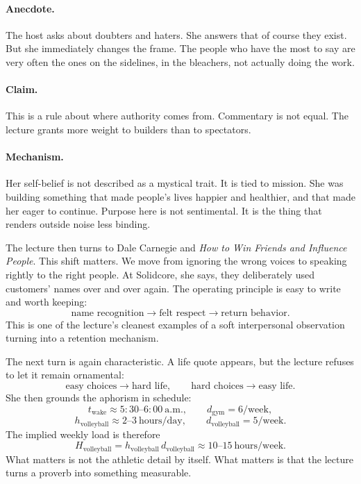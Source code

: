 \paragraph{Anecdote.}
The host asks about doubters and haters. She answers that of course they exist. But she immediately changes the frame. The people who have the most to say are very often the ones on the sidelines, in the bleachers, not actually doing the work.

\paragraph{Claim.}
This is a rule about where authority comes from. Commentary is not equal. The lecture grants more weight to builders than to spectators.

\paragraph{Mechanism.}
Her self-belief is not described as a mystical trait. It is tied to mission. She was building something that made people's lives happier and healthier, and that made her eager to continue. Purpose here is not sentimental. It is the thing that renders outside noise less binding.

The lecture then turns to Dale Carnegie and \emph{How to Win Friends and Influence People}. This shift matters. We move from ignoring the wrong voices to speaking rightly to the right people. At Solidcore, she says, they deliberately used customers' names over and over again. The operating principle is easy to write and worth keeping:
\begin{equation}
\text{name recognition}
\to
\text{felt respect}
\to
\text{return behavior}.
\end{equation}
This is one of the lecture's cleanest examples of a soft interpersonal observation turning into a retention mechanism.

The next turn is again characteristic. A life quote appears, but the lecture refuses to let it remain ornamental:
\begin{equation}
\text{easy choices} \to \text{hard life},
\qquad
\text{hard choices} \to \text{easy life}.
\end{equation}
She then grounds the aphorism in schedule:
\begin{equation}
t_{\text{wake}} \approx 5{:}30\text{--}6{:}00\ \text{a.m.},
\qquad
d_{\text{gym}} = 6/\text{week},
\end{equation}
\begin{equation}
h_{\text{volleyball}} \approx 2\text{--}3\ \text{hours/day},
\qquad
d_{\text{volleyball}} = 5/\text{week}.
\end{equation}
The implied weekly load is therefore
\begin{equation}
H_{\text{volleyball}}
=
h_{\text{volleyball}}\,d_{\text{volleyball}}
\approx
10\text{--}15\ \text{hours/week}.
\end{equation}
What matters is not the athletic detail by itself. What matters is that the lecture turns a proverb into something measurable.

